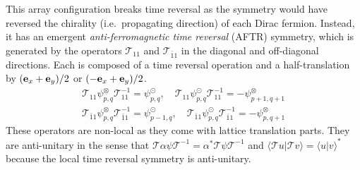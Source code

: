 This array configuration breaks time reversal as the symmetry would have reversed the chirality (i.e.~propagating direction) of each Dirac fermion. Instead, it has an emergent {\em anti-ferromagnetic time reversal} (AFTR) symmetry, which is generated by the operators $\mathcal{T}_{11}$ and $\mathcal{T}_{\bar{1}1}$ in the diagonal and off-diagonal directions. Each is composed of a time reversal operation and a half-translation by $({\bf e}_x+{\bf e}_y)/2$ or $(-{\bf e}_x+{\bf e}_y)/2$. \begin{gather}\mathcal{T}_{11}\psi_{p,q}^\otimes\mathcal{T}_{11}^{-1}=\psi_{p,q}^\odot,\quad\mathcal{T}_{11}\psi_{p,q}^\odot\mathcal{T}_{11}^{-1}=-\psi_{p+1,q+1}^\otimes\nonumber\\\mathcal{T}_{\bar{1}1}\psi_{p,q}^\otimes\mathcal{T}_{\bar{1}1}^{-1}=\psi_{p-1,q}^\odot,\quad\mathcal{T}_{\bar{1}1}\psi_{p,q}^\odot\mathcal{T}_{\bar{1}1}^{-1}=-\psi_{p,q+1}^\otimes\label{AFTR}\end{gather} These \AFTR operators are non-local as they come with lattice translation parts. They are anti-unitary in the sense that $\mathcal{T}\alpha\psi\mathcal{T}^{-1}=\alpha^\ast\mathcal{T}\psi\mathcal{T}^{-1}$ and $\langle\mathcal{T}u|\mathcal{T}v\rangle=\langle u|v\rangle^\ast$ because the local time reversal symmetry is anti-unitary. %
